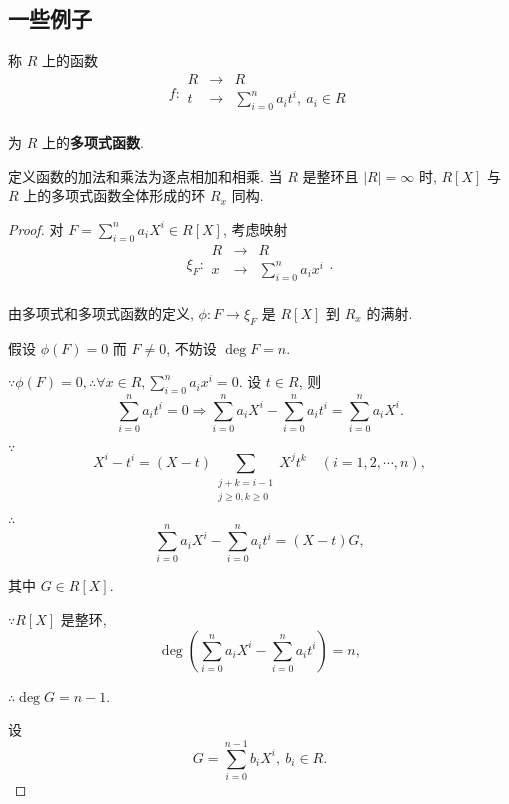 \documentclass[UTF8]{ctexart}
\begin{document}
\subsection{一些例子}
\begin{example}\label{exp2.5}
    称 $R$ 上的函数
    \[f:\begin{array}{rcl}
        R & \to & R \\
        t & \to & \sum\limits_{i=0}^{n}a_it^i,\ a_i\in R \\
    \end{array}\]

    为 $R$ 上的\textbf{多项式函数}.

    定义函数的加法和乘法为逐点相加和相乘. 当 $R$ 是整环且 $|R|=\infty$ 时, $R[X]$ 与 $R$ 上的多项式函数全体形成的环 $R_x$ 同构.
\end{example}
\begin{proof}
    对 $F=\sum\limits_{i=0}^{n}a_iX^i\in R[X]$, 考虑映射
    \[\xi_F:\begin{array}{rcl}
        R & \to & R \\
        x & \to & \sum\limits_{i=0}^{n}a_ix^i \\
    \end{array}.\]

    由多项式和多项式函数的定义, $\phi:F\to\xi_F$ 是 $R[X]$ 到 $R_x$ 的满射.

    假设 $\phi(F)=0$ 而 $F\neq0$, 不妨设 $\deg F=n$.

    $\because\phi(F)=0,\therefore\forall x\in R,\sum\limits_{i=0}^{n}a_ix^i=0$. 设 $t\in R$, 则
    \[\sum\limits_{i=0}^{n}a_it^i=0\Rightarrow\sum\limits_{i=0}^{n}a_iX^i-\sum\limits_{i=0}^{n}a_it^i=\sum\limits_{i=0}^{n}a_iX^i.\]

    $\because$
    \[X^i-t^i=(X-t)\sum\limits_{\substack{j+k=i-1\\j\geq0,k\geq0}}X^jt^k\quad(i=1,2,\cdots,n),\]

    $\therefore$
    \begin{equation}\label{eq2.3}
        \sum\limits_{i=0}^{n}a_iX^i-\sum\limits_{i=0}^{n}a_it^i=(X-t)G,
    \end{equation}

    其中 $G\in R[X]$.

    $\because R[X]$ 是整环,
    \[\deg\left(\sum\limits_{i=0}^{n}a_iX^i-\sum\limits_{i=0}^{n}a_it^i\right)=n,\]

    $\therefore\deg G=n-1$.

    设
    \[G=\sum\limits_{i=0}^{n-1}b_iX^i,\ b_i\in R.\]


\end{proof}
\end{document}
